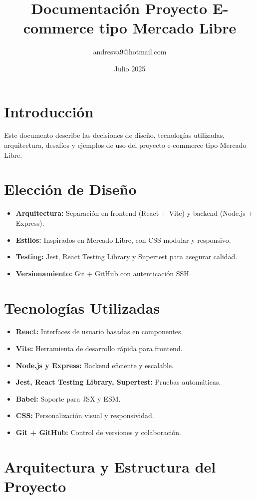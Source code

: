 \documentclass[12pt]{article}
\title{\textbf{Documentación Proyecto E-commerce tipo Mercado Libre}}
\author{andresva9@hotmail.com}
\date{Julio 2025}
\begin{document}
\maketitle
\tableofcontents
\newpage

\section{Introducción}
Este documento describe las decisiones de diseño, tecnologías utilizadas, arquitectura, desafíos y ejemplos de uso del proyecto e-commerce tipo Mercado Libre.

\section{Elección de Diseño}
\begin{itemize}
  \item \textbf{Arquitectura:} Separación en frontend (React + Vite) y backend (Node.js + Express).
  \item \textbf{Estilos:} Inspirados en Mercado Libre, con CSS modular y responsivo.
  \item \textbf{Testing:} Jest, React Testing Library y Supertest para asegurar calidad.
  \item \textbf{Versionamiento:} Git + GitHub con autenticación SSH.
\end{itemize}

\section{Tecnologías Utilizadas}
\begin{itemize}
  \item \textbf{React:} Interfaces de usuario basadas en componentes.
  \item \textbf{Vite:} Herramienta de desarrollo rápida para frontend.
  \item \textbf{Node.js y Express:} Backend eficiente y escalable.
  \item \textbf{Jest, React Testing Library, Supertest:} Pruebas automáticas.
  \item \textbf{Babel:} Soporte para JSX y ESM.
  \item \textbf{CSS:} Personalización visual y responsividad.
  \item \textbf{Git + GitHub:} Control de versiones y colaboración.
\end{itemize}

\section{Arquitectura y Estructura del Proyecto}
\end{document}
